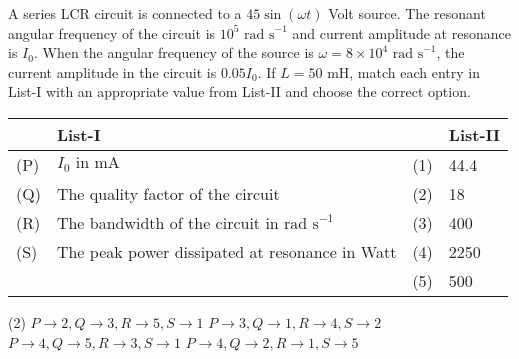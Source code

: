 \item A series LCR circuit is connected to a \(45 \sin(\omega t)\) Volt source. The resonant angular frequency of the circuit is \(10^5 \text{ rad s}^{-1}\) and current amplitude at resonance is \(I_0\). When the angular frequency of the source is \(\omega = 8 \times 10^4 \text{ rad s}^{-1}\), the current amplitude in the circuit is \(0.05 I_0\). If \(L = 50\) mH, match each entry in List-I with an appropriate value from List-II and choose the correct option.
            
    \begin{center}
        \renewcommand{\arraystretch}{2}
        \begin{table}[h]
            \centering
            \begin{tabular}{p{0.5cm}p{8cm}|p{0.5cm}p{5cm}}
            \hline
            & List-I & & List-II \\
            \hline
            (P) & \(I_0 \text{ in mA}\) & (1) & 44.4 \\
            (Q) & The quality factor of the circuit & (2) & 18 \\
            (R) & The bandwidth of the circuit in \(\text{rad s}^{-1}\) & (3) & 400 \\
            (S) & The peak power dissipated at resonance in Watt & (4) & 2250 \\
            & & (5) & 500 \\
            \hline
            \end{tabular}
        \end{table}
    \end{center}
            
    \begin{tasks}(2)
        \task \(P \rightarrow 2, Q \rightarrow 3, R \rightarrow 5, S \rightarrow 1\)
        \task \(P \rightarrow 3, Q \rightarrow 1, R \rightarrow 4, S \rightarrow 2\)\ans
        \task \(P \rightarrow 4, Q \rightarrow 5, R \rightarrow 3, S \rightarrow 1\)
        \task \(P \rightarrow 4, Q \rightarrow 2, R \rightarrow 1, S \rightarrow 5\)
    \end{tasks}